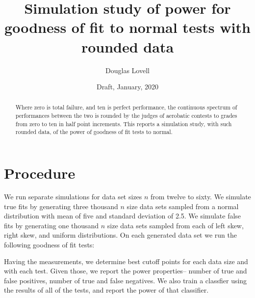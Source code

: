 \documentclass[10pt,twocolumn]{article}
\title{Simulation study of power for goodness of fit to normal tests with
  rounded data}
\author{Douglas Lovell}
\date{Draft, January, 2020}
\begin{document}
\maketitle
\begin{abstract}
Where zero is total failure, and ten is perfect performance, the continuous
spectrum of performances between the two is rounded by the judges of
aerobatic contests to grades from zero to ten in half point increments.
This reports a simulation study, with such rounded data, of the power of
goodness of fit tests to normal.
\end{abstract}

\section{Procedure}

We run separate simulations for data set sizes $n$ from twelve to sixty.
We simulate true fits by generating three thousand $n$ size data sets
sampled from a normal distribution with mean of five and standard deviation
of 2.5.
We simulate false fits by generating one thousand $n$ size data sets
sampled from each of left skew, right skew, and uniform distributions.
On each generated data set we run the following goodness of fit tests:
\begin{itemize}
\end{itemize}

Having the measurements, we determine best cutoff points for each data size
and with each test. Given those, we report the power properties-- number of
true and false positives, number of true and false negatives. We also train
a classfier using the results of all of the tests, and report the power
of that classifier.



\end{document}
